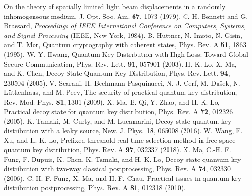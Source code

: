\documentclass[aps,pra,twocolumn,a4paper,nofootinbib,preprintnumbers] {revtex4-1}
\begin{document}
\begin{thebibliography}{99}
	On the theory of spatially limited light beam displacements in a randomly inhomogeneous medium,
	J. Opt. Soc. Am. \textbf{67}, 1073 (1979).
	C. H. Bennett and G. Brassard,
	\textit{Proceedings of IEEE International Conference on Computers, Systems, and Signal Processing}
	(IEEE, New York, 1984).
	B. Huttner, N. Imoto, N. Gisin, and T. Mor,
	Quantum cryptography with coherent states,
	Phys. Rev. A \textbf{51}, 1863 (1995).
	W.-Y. Hwang,
	Quantum Key Distribution with High Loss: Toward Global Secure Communication,
	Phys. Rev. Lett. \textbf{91}, 057901 (2003).
	H.-K. Lo, X. Ma, and K. Chen,
	Decoy State Quantum Key Distribution,
	Phys. Rev. Lett. \textbf{94}, 230504 (2005).
	V. Scarani, H. Bechmann-Pasquinucci, N. J. Cerf, M. Du\v{s}ek, N. L\"utkenhaus, and M. Peev,
	The security of practical quantum key distribution,
	Rev. Mod. Phys. \textbf{81}, 1301 (2009).
	X. Ma, B. Qi, Y. Zhao, and H.-K. Lo,
	Practical decoy state for quantum key distribution,
	Phys. Rev. A \textbf{72}, 012326 (2005).
	K. Tamaki, M. Curty, and M. Lucamarini,
	Decoy-state quantum key distribution with a leaky source,
	New. J. Phys. \textbf{18}, 065008 (2016).
	W. Wang, F. Xu, and H.-K. Lo,
	Prefixed-threshold real-time selection method in free-space quantum key distribution,
	Phys. Rev. A \textbf{97}, 032337 (2018).
	X. Ma, C.-H. F. Fung, F. Dupuis, K. Chen, K. Tamaki, and H. K. Lo,
	Decoy-state quantum key distribution with two-way classical postprocessing,
	Phys. Rev. A \textbf{74}, 032330 (2006).
	C.-H. F. Fung, X. Ma, and H. F. Chau,
	Practical issues in quantum-key-distribution postprocessing,
	Phys. Rev. A \textbf{81}, 012318 (2010).




\end{thebibliography}
\end{document}
